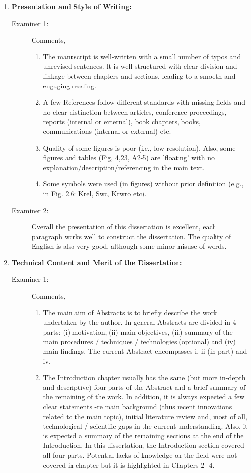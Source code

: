 \documentclass[14pt,twoside]{report}
\begin{document}
\medskip

\begin{enumerate}
%
    \item {\bf Presentation and Style of Writing:}
        \begin{description}
            \item[Examiner 1:] Comments,
                \begin{enumerate}
                   \item The manuscript is well-written with a small number of typos and unrevised sentences. It is well-structured with clear division and linkage between chapters and sections, leading to a smooth and engaging reading.
                   \item A few References follow different standards with missing fields and no clear distinction between articles, conference proceedings, reports (internal or external), book chapters, books, communications (internal or external) etc. 
                   \item Quality of some figures is poor (i.e., low resolution). Also, some figures and tables (Fig, 4,23, A2-5) are 'floating' with no explanation/description/referencing in the main text.
                   \item Some symbols were used (in figures) without prior definition (e.g., in Fig. 2.6: Krel, Swc, Krwro etc).
                \end{enumerate}
            \item[Examiner 2:] Overall the presentation of this dissertation is excellent, each paragraph works well to construct the dissertation. The quality of English is also very good, although some minor misuse of words.
        \end{description}
%
    \item {\bf Technical Content and Merit of the Dissertation:}
        \begin{description}
            \item[Examiner 1:] Comments,
                \begin{enumerate}
                   \item The main aim of Abstracts is to briefly describe the work undertaken by the author. In general Abstracts are divided in 4 parts: (i) motivation, (ii) main objectives, (iii) summary of the main procedures / techniques / technologies (optional) and (iv) main findings. The current Abstract encompasses i, ii (in part) and iv.
                   \item The Introduction chapter usually has the same (but more in-depth and descriptive) four parts of the Abstract and a brief summary of the remaining of the work. In addition, it is always expected a few clear statements -re main background (thus recent innovations related to the main topic), initial literature review and, most of all, technological / scientific gaps in the current understanding. Also, it is expected a summary of the remaining sections at the end of the Introduction. In this dissertation, the Introduction section covered all four parts.  Potential lacks of knowledge on the field were not covered in chapter but it is highlighted in Chapters 2- 4. 

\end{enumerate}
\end{description}
\end{enumerate}
\end{document}

